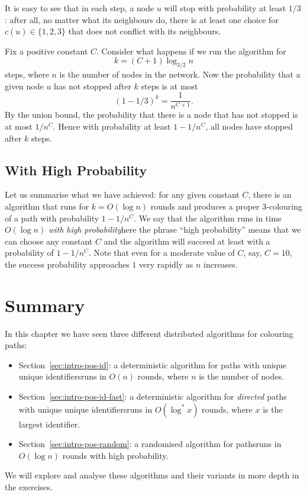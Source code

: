 It is easy to see that in each step, a node $u$ will stop with probability at least $1/3$: after all, no matter what its neighbours do, there is at least one choice for $c(u) \in \{1,2,3\}$ that does not conflict with its neighbours.

Fix a positive constant $C$. Consider what happens if we run the algorithm for
\[
    k = (C+1) \log_{3/2} n
\]
steps, where $n$ is the number of nodes in the network. Now the probability that a given node $u$ has not stopped after $k$ steps is at most
\[
    (1 - 1/3)^k = \frac{1}{n^{C+1}}.
\]
By the union bound, the probability that there is a node that has not stopped is at most $1/n^C$. Hence with probability at least $1-1/n^C$, all nodes have stopped after $k$ steps.


\subsection{With High Probability}

Let us summarise what we have achieved: for any given constant $C$, there is an algorithm that runs for $k = O(\log n)$ rounds and produces a proper $3$-colouring of a path with probability $1-1/n^C$. We say that the algorithm runs in time $O(\log n)$ \emph{with high probability}\mydash here the phrase ``high probability'' means that we can choose any constant $C$ and the algorithm will succeed at least with a probability of $1-1/n^C$. Note that even for a moderate value of $C$, say, $C = 10$, the success probability approaches $1$ very rapidly as $n$ increases.


\section{Summary}

In this chapter we have seen three different distributed algorithms for colouring paths:
\begin{itemize}
    \item Section~\ref{sec:intro-pos-id}: a deterministic algorithm for paths with unique unique identifiers\mydash runs in $O(n)$ rounds, where $n$ is the number of nodes.
    \item Section~\ref{sec:intro-pos-id-fast}: a deterministic algorithm for \emph{directed} paths with unique unique identifiers\mydash runs in $O(\log^* x)$ rounds, where $x$ is the largest identifier.
    \item Section~\ref{sec:intro-pos-random}: a randomised algorithm for paths\mydash runs in $O(\log n)$ rounds with high probability.
\end{itemize}
We will explore and analyse these algorithms and their variants in more depth in the exercises.


